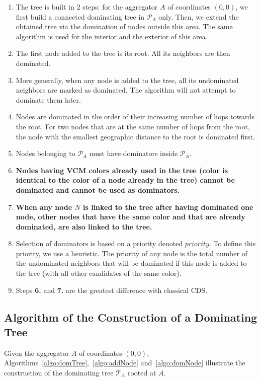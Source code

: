 \begin{enumerate}
\item The tree is built in $2$ steps: for the aggregator $A$ of coordinates  $(0,0)$, we first build a connected dominating tree in $\mathcal{P}_{A}$ only. Then, we extend the obtained tree via the domination of nodes outside this area. The same algorithm is used for the interior and the exterior of this area.
\item The first node added to the tree is its root. All its neighbors are then dominated. 
\item More generally, when any node is added to the tree, all its undominated neighbors are marked as dominated. The algorithm will not attempt to dominate them later.\item Nodes are dominated in the order of their increasing number of hops towards the root. For two nodes that are at the same number of hops from the root, the node with the smallest geographic distance to the root is dominated first.
\item Nodes belonging to $\mathcal{P}_{A}$ must have dominators inside $\mathcal{P}_{A}$.

\item \textbf{Nodes having VCM colors already used in the tree (color is identical to the color of a node already in the tree) cannot be dominated and cannot be used as dominators.}



\item \textbf{When any node $N$ is linked to the tree after having dominated one node, other nodes that have the same color and that are already dominated, are also linked to the tree.}


\item Selection of dominators is based on a priority denoted $priority$. To define this priority, we use a heuristic. The priority of any node is the total number of the undominated neighbors that will be dominated if this node is added to the tree (with all other candidates of the same color).
\item Steps {\bf 6.} and {\bf 7.} are the greatest difference with classical CDS.
\end{enumerate}



\subsection{Algorithm of the Construction of a Dominating Tree}
Given the aggregator $A$ of coordinates $(0,0)$, Algorithms~\ref{algo:domTree},~\ref{algo:addNode}  and~\ref{algo:domNode} illustrate the construction of the dominating tree $\mathcal{T}_A$ rooted at $A$.



